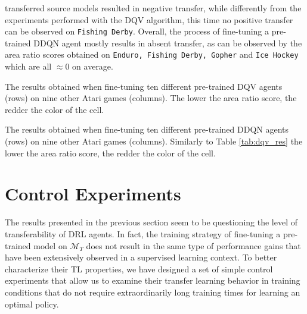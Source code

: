 transferred source models resulted in negative transfer, while differently from the experiments performed with the DQV algorithm, this time no positive transfer can be observed on \texttt{Fishing Derby}. Overall, the process of fine-tuning a pre-trained DDQN agent mostly results in absent transfer, as can be observed by the area ratio scores obtained on \texttt{Enduro, Fishing Derby, Gopher} and \texttt{Ice Hockey} which are all $\approx 0$ on average.  


\begin{table}[ht!]
	\caption{The results obtained when fine-tuning ten different pre-trained DQV agents (rows) on nine other Atari games (columns). The lower the area ratio score, the redder the color of the cell.} %
	
	\label{tab:dqv_res}
\end{table}


\begin{table}[ht!]
	\caption{The results obtained when fine-tuning ten different pre-trained DDQN agents (rows) on nine other Atari games (columns). Similarly to Table \ref{tab:dqv_res} the lower the area ratio score, the redder the color of the cell.} %
	
	\label{tab:ddqn_res}
\end{table}




\section{Control Experiments}
\label{sec:control_experiments}
The results presented in the previous section seem to be questioning the level of transferability of DRL agents. In fact, the training strategy of fine-tuning a pre-trained model on $\mathcal{M}_T$ does not result in the same type of performance gains that have been extensively observed in a supervised learning context. To better characterize their TL properties, we have designed a set of simple control experiments that allow us to examine their transfer learning behavior in training conditions that do not require extraordinarily long training times for learning an optimal policy.   

